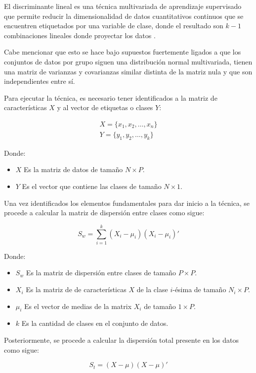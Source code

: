 \documentclass[11pt, letterpaper]{article}
\begin{document}
El discriminante lineal es una técnica multivariada de aprendizaje supervisado que permite reducir la dimensionalidad de datos cuantitativos continuos que se encuentren etiquetados por una variable de clase, donde el resultado son $k-1$ combinaciones lineales donde proyectar los datos \cite{johnson2007}.

 Cabe mencionar que esto se hace bajo supuestos fuertemente ligados a que los conjuntos de datos por grupo siguen una distribución normal multivariada, tienen una matriz de varianzas y covarianzas similar distinta de la matriz nula y que son independientes entre sí.
	
Para ejecutar la técnica, es necesario tener identificados a la matriz de características $X$ y al vector de etiquetas o clases $Y$: 
	
	$$
	 \begin{matrix}
	 	X = \{x_1,x_2,\dots,x_n\} \\
	 	Y = \{y_1, y_2,\dots ,y_k\}
	 \end{matrix}
	$$
	
	Donde: 
	\begin{itemize}
		\item $X$ Es la matriz de datos de tamaño $N\times P$.
		\item $Y$ Es el vector que contiene las clases de tamaño $N\times 1 $.
	\end{itemize}
	

Una vez identificados los elementos fundamentales para dar inicio a la técnica, se procede a calcular la matriz de dispersión entre clases como sigue:

$$S_w = \sum_{i = 1}^{k} {(X_i-\mu_i)(X_i-\mu_i)' }$$

	Donde: 
	\begin{itemize}
		\item $S_w$ Es la matriz de dispersión entre clases de tamaño $P\times P$.
		\item $X_i$ Es la matriz de de características $X$ de la clase $i$-ésima de tamaño $N_i \times P$.
		\item $\mu_i$ Es el vector de medias de la matrix $X_i$ de tamaño $1\times P$.
		\item $k$ Es la cantidad de clases en el conjunto de datos.
	\end{itemize}

\newpage

Posteriormente, se procede a calcular la dispersión total presente en los datos como sigue:

$$S_t = {(X-\mu)(X-\mu)' }$$
\end{document}
